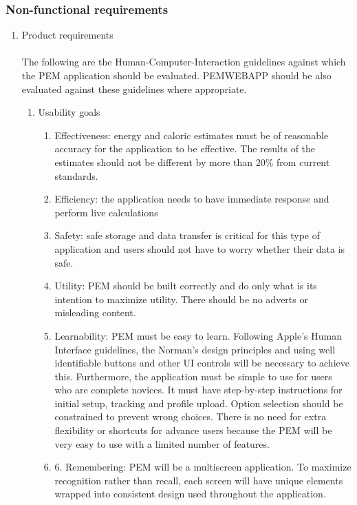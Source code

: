 \documentclass[12pt, a4paper]{report}   %
\begin{document}
\begin{enumerate}
\subsubsection{Non-functional requirements}

\begin{enumerate}
	\item Product requirements\\ \\
	The following are the Human-Computer-Interaction guidelines against which the PEM application should be evaluated. PEMWEBAPP should be also evaluated against these guidelines where appropriate.\\
	\begin{enumerate}
		\item Usability goals
		\begin {enumerate}
			\item Effectiveness: energy and caloric estimates must be of reasonable accuracy for the application to be effective. The results of the estimates should not be different by more than 20\% from current standards.
			\item Efficiency: the application needs to have immediate response and perform live calculations 
			\item Safety: safe storage and data transfer is critical for this type of application and users should not have to worry whether their data is safe.
			\item Utility: PEM should be built correctly and do only what is its intention to maximize utility. There should be no adverts or misleading content.
			\item Learnability: PEM must be easy to learn. Following Apple's Human Interface guidelines, the Norman's design principles and using well identifiable buttons and other UI controls will be necessary to achieve this. Furthermore, the application must be simple to use for users who are complete novices. It must have step-by-step instructions for initial setup, tracking and profile upload. Option selection should be constrained to prevent wrong choices. There is no need for extra flexibility or shortcuts for advance users because the PEM will be very easy to use with a limited number of features.
			\item 6. Remembering: PEM will be a multiscreen application. To maximize recognition rather than recall, each screen will have unique elements wrapped into consistent design used throughout the application.\\
		\end{enumerate}


\end{enumerate}
\end{enumerate}
\end{enumerate}
\end{document}
